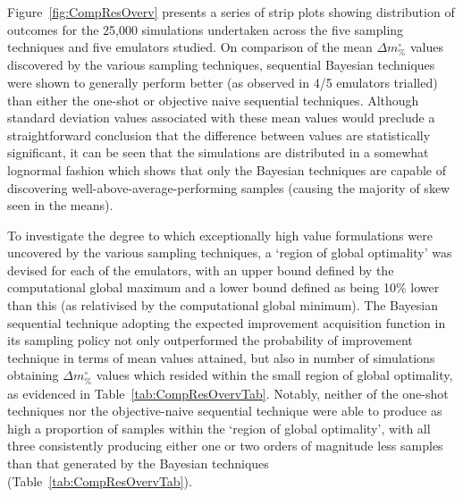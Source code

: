 
Figure~\ref{fig:CompResOverv} presents a series of strip plots showing
 distribution of outcomes for the 25,000 simulations undertaken across
 the five sampling techniques and five emulators studied.
On comparison of the mean \(\Delta m_{\%}^{\circ}\) values discovered by the
 various sampling techniques, sequential Bayesian techniques were shown to
 generally perform better (as observed in 4/5 emulators trialled) than either
 the one-shot or objective naive sequential techniques.
Although standard deviation values associated with these mean values would
 preclude a straightforward conclusion that the difference between values
 are statistically significant, it can be seen that the simulations are 
 distributed in a somewhat lognormal fashion which shows that only the 
 Bayesian techniques are capable of discovering well-above-average-performing 
 samples (causing the majority of skew seen in the means).

To investigate the degree to which exceptionally high value formulations
 were uncovered by the various sampling techniques, a `region of global 
 optimality' was devised for each of the emulators, with an upper bound 
 defined by the computational global maximum and a lower bound defined as 
 being 10\% lower than this (as relativised by the computational global 
 minimum).
The Bayesian sequential technique adopting the expected improvement
 acquisition function in its sampling policy not only outperformed the
 probability of improvement technique in terms of mean values attained,
 but also in number of simulations obtaining \(\Delta m_{\%}^{\circ}\)
 values which resided within the small region of global optimality,
 as evidenced in Table~\ref{tab:CompResOvervTab}.
Notably, neither of the one-shot techniques nor the objective-naive
 sequential technique were able to produce as high a proportion of 
 samples within the `region of global optimality', with all three
 consistently producing either one or two orders of magnitude less
 samples than that generated by the Bayesian techniques 
 (Table~\ref{tab:CompResOvervTab}).

